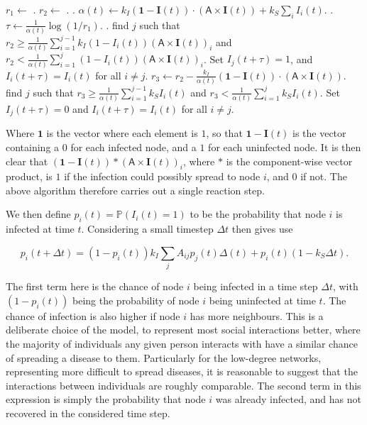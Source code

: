 \documentclass[12pt,a4paper,openany,twoside]{book}
\renewcommand{\v}[1]{\mathbf{#1}}      %
\newcommand{\m}[1]{\bm{\mathsf{#1}}}	 %
\begin{document}
\begin{algorithmic}
	\State $r_1 \gets$ .
	\State $r_2 \gets$ .
	.
	\State $\alpha(t) \gets k_I (\v{1} - \v{I}(t)) \cdot (\m{A} \times \v{I}(t)) + k_S \sum_i I_i(t)$.
	.
	\State $\tau \gets \frac 1 {\alpha(t)} \log(1/r_1)$.
	.
	\If {$r_2 < k_I (\v{1} - \v{I}(t)) \cdot (\m{A} \times \v{I}(t))$}
		\State find $j$ such that $r_2 \geq \frac 1 {\alpha(t)} \sum_{i = 1}^{j-1} k_I (1 - I_i(t)) (\m{A} \times \v{I}(t))_i$ and $r_2 < \frac 1 {\alpha(t)} \sum_{i = 1}^j (1 - I_i(t)) (\m{A} \times \v{I}(t))_i$.
		Set $I_j(t + \tau) = 1$, and $I_i(t + \tau) = I_i(t)$ for all $i \neq j$.
	\Else
		\State $r_3 \gets r_2 - \frac {k_I} {\alpha(t)} (\v{1} - \v{I}(t)) \cdot (\m{A} \times \v{I}(t))$.
		\State find $j$ such that $r_3 \geq \frac 1 {\alpha(t)} \sum_{i = 1}^{j-1} k_S I_i(t)$ and $r_3 < \frac 1 {\alpha(t)} \sum_{i = 1}^j k_S I_i(t)$.
		Set $I_j(t + \tau) = 0$ and $I_i(t + \tau) = I_i(t)$ for all $i \neq j$.
	\EndIf
\end{algorithmic}

Where $\v{1}$ is the vector where each element is $1$, so that $\v{1} - \v{I}(t)$ is the vector containing a $0$ for each infected node, and a $1$ for each uninfected node. It is then clear that $(\v{1} - \v{I}(t)) * (\m{A} \times \v{I}(t))_i$, where $*$ is the component-wise vector product, is $1$ if the infection could possibly spread to node $i$, and $0$ if not. The above algorithm therefore carries out a single reaction step.

We then define $p_i(t) = \mathbb{P}(I_i(t) = 1)$ to be the probability that node $i$ is infected at time $t$. Considering a small timestep $\Delta t$ then gives use

\begin{equation}
	p_i(t + \Delta t) = (1 - p_i(t)) k_I \sum_j A_{ij} p_j(t) \Delta(t) + p_i(t) (1 - k_S \Delta t).
\end{equation}

The first term here is the chance of node $i$ being infected in a time step $\Delta t$, with $(1 - p_i(t))$ being the probability of node $i$ being uninfected at time $t$. The chance of infection is also higher if node $i$ has more neighbours. This is a deliberate choice of the model, to represent most social interactions better, where the majority of individuals any given person interacts with have a similar chance of spreading a disease to them. Particularly for the low-degree networks, representing more difficult to spread diseases, it is reasonable to suggest that the interactions between individuals are roughly comparable. The second term in this expression is simply the probability that node $i$ was already infected, and has not recovered in the considered time step.
\end{document}
